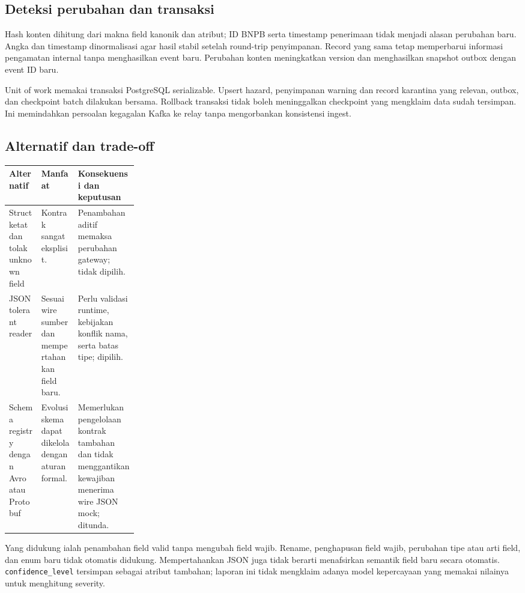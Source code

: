 \subsection{Deteksi perubahan dan transaksi}
Hash konten dihitung dari makna field kanonik dan atribut; ID BNPB serta timestamp penerimaan tidak menjadi alasan perubahan baru. Angka dan timestamp dinormalisasi agar hasil stabil setelah round-trip penyimpanan. Record yang sama tetap memperbarui informasi pengamatan internal tanpa menghasilkan event baru. Perubahan konten meningkatkan version dan menghasilkan snapshot outbox dengan event ID baru.

Unit of work memakai transaksi PostgreSQL serializable. Upsert hazard, penyimpanan warning dan record karantina yang relevan, outbox, dan checkpoint batch dilakukan bersama. Rollback transaksi tidak boleh meninggalkan checkpoint yang mengklaim data sudah tersimpan. Ini memindahkan persoalan kegagalan Kafka ke relay tanpa mengorbankan konsistensi ingest.


\subsection{Alternatif dan trade-off}
\begin{tabularx}{\linewidth}{P{0.25\linewidth}YY}
\toprule Alternatif & Manfaat & Konsekuensi dan keputusan\\\midrule
Struct ketat dan tolak unknown field & Kontrak sangat eksplisit. & Penambahan aditif memaksa perubahan gateway; tidak dipilih.\\
JSON tolerant reader & Sesuai wire sumber dan mempertahankan field baru. & Perlu validasi runtime, kebijakan konflik nama, serta batas tipe; dipilih.\\
Schema registry dengan Avro atau Protobuf & Evolusi skema dapat dikelola dengan aturan formal. & Memerlukan pengelolaan kontrak tambahan dan tidak menggantikan kewajiban menerima wire JSON mock; ditunda.\\
\bottomrule
\end{tabularx}

Yang didukung ialah penambahan field valid tanpa mengubah field wajib. Rename, penghapusan field wajib, perubahan tipe atau arti field, dan enum baru tidak otomatis didukung. Mempertahankan JSON juga tidak berarti menafsirkan semantik field baru secara otomatis. \texttt{confidence\_level} tersimpan sebagai atribut tambahan; laporan ini tidak mengklaim adanya model kepercayaan yang memakai nilainya untuk menghitung severity.

